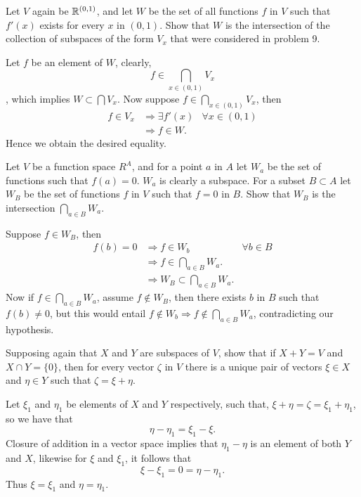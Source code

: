 \documentclass[../../main.tex]{subfiles}
\begin{document}
\begin{problem}
Let $V$ again be $\mathbb{R}^{(0,1)}$, and let $W$ be the set of all functions $f$ in $V$ such that $f'(x)$ exists for every $x$ in $(0,1)$. Show that $W$ is the intersection of the collection of subspaces of the form $V_x$ that were considered in problem 9.	
\end{problem}
\begin{solution}
	Let $f$ be an element of $W$, clearly, \[f \in \bigcap_{x \in (0,1)} V_x \], which implies $W \subset \bigcap V_x$. Now suppose $f \in \bigcap_{x\in(0,1)} V_x$, then
	\begin{align*}
		f \in V_x & \Rightarrow \exists f'(x)  & \forall x \in (0,1) \\
		& \Rightarrow f \in W.
	\end{align*}
	Hence we obtain the desired equality.
\end{solution}
\begin{problem}
	Let $V$ be a function space $R^A$, and for a point $a$ in $A$ let $W_a$ be the set of functions such that $f(a) = 0$. $W_a$ is clearly a subspace. For a subset $B \subset A$ let $W_B$ be the set of functions $f$ in $V$ such that $f = 0$ in $B$. Show that $W_B$ is the intersection $\bigcap_{a \in B} W_a$.
\end{problem}
\begin{solution}
	Suppose $f \in W_B$, then
	\begin{align*}
		f(b) = 0 &\Rightarrow f \in W_b & \forall b \in B \\
		& \Rightarrow f \in \bigcap_{a \in B} W_a. & \\
		& \Rightarrow W_B \subset \bigcap_{a \in B} W_a. &
	\end{align*}
Now if $f \in \bigcap_{a \in B} W_a$, assume $f \notin W_B$, then there exists $b$ in $B$ such that $f(b) \neq 0$, but this would entail $f \notin W_b \Rightarrow f \notin \bigcap_{a \in B} W_a$, contradicting our hypothesis.
\end{solution}
\begin{problem}
	Supposing again that $X$ and $Y$ are subspaces of $V$, show that if $X+Y = V$ and $X \cap Y = \{0\}$, then for every vector $\zeta$ in $V$ there is a unique pair of vectors $\xi \in X$ and $\eta \in Y$ such that $\zeta = \xi + \eta$.
\end{problem}
\begin{solution}
	Let $\xi_1$ and  $\eta_1$ be elements of $X$ and $Y$ respectively, such that, $\xi + \eta = \zeta = \xi_1 + \eta_1$, so we have that 	\[
	\eta - \eta_1 = \xi_1 - \xi.
	\]
	Closure of addition in a vector space implies that $\eta_1 - \eta$ is an element of both $Y$ and $X$, likewise for $\xi$ and $\xi_1$, it follows that 
	\[
	\xi - \xi_1 = 0  = \eta - \eta_1.
	\]
	Thus $\xi = \xi_1$ and $\eta = \eta_1$.
\end{solution}
\end{document}
